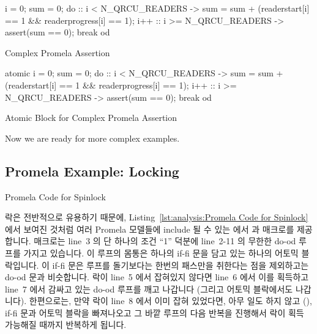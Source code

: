\begin{listing}[tbp]
\begin{VerbatimL}
i = 0;
sum = 0;
do
:: i < N_QRCU_READERS ->
	sum = sum + (readerstart[i] == 1 &&
	             readerprogress[i] == 1);
	i++
:: i >= N_QRCU_READERS ->
	assert(sum == 0);
	break
od
\end{VerbatimL}
\caption{Complex Promela Assertion}
\label{lst:formal:Complex Promela Assertion}
\end{listing}

\begin{listing}[tbp]
\begin{VerbatimL}
atomic {
	i = 0;
	sum = 0;
	do
	:: i < N_QRCU_READERS ->
		sum = sum + (readerstart[i] == 1 &&
		             readerprogress[i] == 1);
		i++
	:: i >= N_QRCU_READERS ->
		assert(sum == 0);
		break
	od
}
\end{VerbatimL}
\caption{Atomic Block for Complex Promela Assertion}
\label{lst:formal:Atomic Block for Complex Promela Assertion}
\end{listing}

Now we are ready for more complex examples.

\subsection{Promela Example: Locking}
\label{sec:formal:Promela Example: Locking}

\begin{listing}[tbp]

\caption{Promela Code for Spinlock}
\label{lst:formal:Promela Code for Spinlock}
\end{listing}

락은 전반적으로 유용하기 때문에,
Listing~\ref{lst:analysis:Promela Code for Spinlock} 에서 보여진 것처럼 여러
Promela 모델들에 include 될 수 있는  에서  과
  매크로를 제공합니다.
 매크로는 line~3 의 단 하나의 조건 ``1'' 덕분에 line~2-11 의
무한한 do-od 루프를 가지고 있습니다.
이 루프의 몸통은 하나의 if-fi 문을 담고 있는 하나의 어토믹 블락입니다.
이 if-fi 문은 루프를 돌기보다는 한번의 패스만을 취한다는 점을 제외하고는 do-od
문과 비슷합니다.
락이 line~5 에서 잡혀있지 않다면 line~6 에서 이를 획득하고 line~7 에서 감싸고
있는 do-od 루프를 깨고 나갑니다 (그리고 어토믹 블락에서도 나갑니다).
한편으로는, 만약 락이 line~8 에서 이미 잡혀 있었다면, 아무 일도 하지 않고
(), if-fi 문과 어토믹 블락을 빠져나오고 그 바깥 루프의 다음 반복을
진행해서 락이 획득 가능해질 때까지 반복하게 됩니다.
\iffalse

